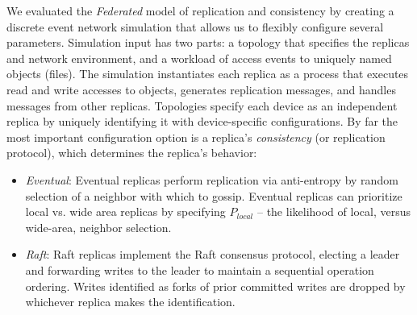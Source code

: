 \documentclass[10pt,conference,letterpaper]{IEEEtran}
\begin{document}

We evaluated the \emph{Federated} model of replication and consistency by creating a
discrete event network simulation that allows us to flexibly configure several parameters.
Simulation input has two parts: a topology that specifies the replicas and
network environment, and a workload of access events to uniquely named objects
(files).
The simulation instantiates each replica as a process that executes read and
write accesses to objects, generates replication messages, and
handles messages from other replicas.
Topologies specify each device as an independent replica by uniquely identifying it
with device-specific configurations.
By far the most important configuration option is a replica's \textit{consistency} (or replication
protocol), which determines the replica's behavior:
\begin{itemize}
    \item \emph{Eventual}: Eventual replicas perform replication via anti-entropy by random
      selection of a neighbor with which to gossip. Eventual  replicas can prioritize
      local vs. wide area replicas by specifying $P_{local}$ -- the likelihood
      of local, versus wide-area, neighbor selection.
    \item \emph{Raft}: Raft replicas implement the Raft consensus protocol, electing a
      leader and forwarding writes to the leader to maintain a sequential
      operation ordering. 
      Writes identified as forks of prior committed writes are dropped by
      whichever replica makes the identification.
\end{itemize}
\end{document}
